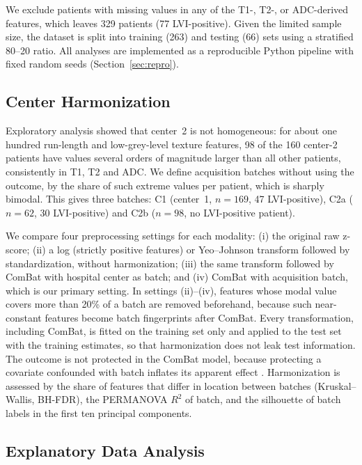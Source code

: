 \documentclass[conference]{IEEEtran}
\begin{document}
We exclude patients with missing values in any of the T1-, T2-, or ADC-derived features, which leaves 329 patients (77 LVI-positive). Given the limited sample size, the dataset is split into training (263) and testing (66) sets using a stratified 80–20 ratio. All analyses are implemented as a reproducible Python pipeline with fixed random seeds (Section~\ref{sec:repro}).

\subsection{Center Harmonization}

Exploratory analysis showed that center~2 is not homogeneous: for about one hundred run-length and low-grey-level texture features, 98 of the 160 center-2 patients have values several orders of magnitude larger than all other patients, consistently in T1, T2 and ADC. We define acquisition batches without using the outcome, by the share of such extreme values per patient, which is sharply bimodal. This gives three batches: C1 (center~1, $n=169$, 47 LVI-positive), C2a ($n=62$, 30 LVI-positive) and C2b ($n=98$, no LVI-positive patient).

We compare four preprocessing settings for each modality: (i) the original raw z-score; (ii) a log (strictly positive features) or Yeo–Johnson transform followed by standardization, without harmonization; (iii) the same transform followed by ComBat \cite{johnson2007combat} with hospital center as batch; and (iv) ComBat with acquisition batch, which is our primary setting. In settings (ii)–(iv), features whose modal value covers more than 20\% of a batch are removed beforehand, because such near-constant features become batch fingerprints after ComBat. Every transformation, including ComBat, is fitted on the training set only and applied to the test set with the training estimates, so that harmonization does not leak test information. The outcome is not protected in the ComBat model, because protecting a covariate confounded with batch inflates its apparent effect \cite{nygaard2016methods}. Harmonization is assessed by the share of features that differ in location between batches (Kruskal–Wallis, BH-FDR), the PERMANOVA $R^2$ of batch, and the silhouette of batch labels in the first ten principal components.

\subsection{Explanatory Data Analysis}
\end{document}
